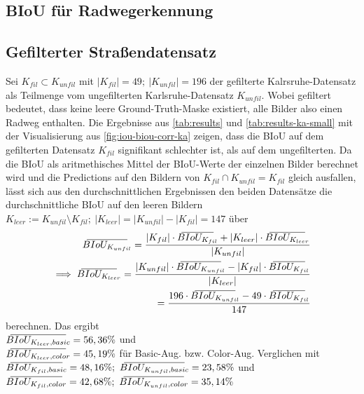 \subsection{BIoU für Radwegerkennung}

\subsection{Gefilterter Straßendatensatz}

\newcommand{\overbar}[1]{\mkern 8mu\overline{\mkern-8mu#1\mkern-8mu}\mkern 8mu}

Sei $K_{fil} \subset K_{unfil}$ mit $|K_{fil}| = 49; ~|K_{unfil}| = 196$ der gefilterte Kalrsruhe-Datensatz 
als Teilmenge vom ungefilterten Karlsruhe-Datensatz $K_{unfil}$. Wobei gefiltert bedeutet, dass 
keine leere Ground-Truth-Maske existiert, alle Bilder also einen Radweg enthalten.
Die Ergebnisse aus \autoref{tab:results} und \autoref{tab:results-ka-small} mit der Visualisierung aus 
\autoref{fig:iou-biou-corr-ka} zeigen, dass die BIoU auf dem gefilterten Datensatz $K_{fil}$ signifikant 
schlechter ist, als auf dem ungefilterten. Da die BIoU als aritmethisches Mittel der BIoU-Werte der einzelnen Bilder 
berechnet wird und die Predictions auf den Bildern von $K_{fil} \cap K_{unfil} = K_{fil}$ gleich ausfallen, 
lässt sich aus den durchschnittlichen Ergebnissen den beiden Datensätze die durchschnittliche BIoU auf den leeren Bildern 
$K_{leer} := K_{unfil} \setminus K_{fil};~ |K_{leer}| = |K_{unfil}| - |K_{fil}| = 147$ über   
\begin{align}
	\overbar{BIoU_{K_{unfil}}} = \frac{|K_{fil}| \cdot \overbar{BIoU_{K_{fil}}} + |K_{leer}| \cdot \overbar{BIoU_{K_{leer}}}}{|K_{unfil}|} \nonumber \\
	\label{eq:ka-empty}  \implies \overbar{BIoU_{K_{leer}}} = \frac{|K_{unfil}| \cdot \overbar{BIoU_{K_{unfil}}} - |K_{fil}| \cdot \overbar{BIoU_{K_{fil}}}}{|K_{leer}|} \\ 
	= \frac{196 \cdot \overbar{BIoU_{K_{unfil}}} - 49 \cdot \overbar{BIoU_{K_{fil}}}}{147} \nonumber
\end{align}
berechnen. Das ergibt \\ 
$\overbar{BIoU_{K_{leer}, basic}} = 56,36\%$ und \\ 
$\overbar{BIoU_{K_{leer}, color}} = 45,19\%$
für Basic-Aug. bzw. Color-Aug. Verglichen mit \\ 
$\overbar{BIoU_{K_{fil}, basic}} = 48,16\%; ~\overbar{BIoU_{K_{unfil}, basic}} = 23,58\%$ und \\
$\overbar{BIoU_{K_{fil}, color}} = 42,68\%; ~\overbar{BIoU_{K_{unfil}, color}} = 35,14\%$
